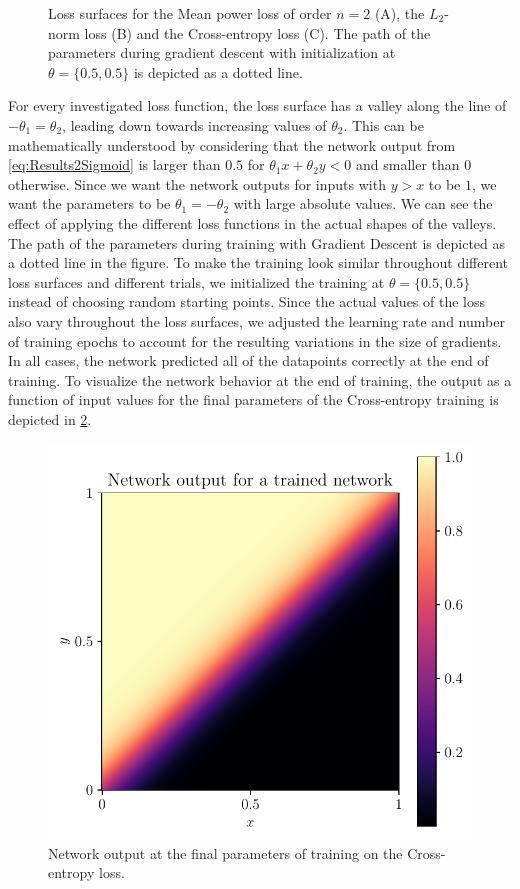 \begin{figure}
	\caption{Loss surfaces for the Mean power loss of order $n=2$ (A), the $L_2$-norm loss (B) and the Cross-entropy loss (C). The path of the parameters during gradient descent with initialization at $\theta = \{0.5, 0.5\}$ is depicted as a dotted line.}
	\label{fig:Results2LossSurfaces}
\end{figure}
For every investigated loss function, the loss surface has a valley along the line of $-\theta_1 = \theta_2$, leading down towards increasing values of  $\theta_2$. This can be mathematically understood by considering that the network output from \cref{eq:Results2Sigmoid} is larger than $0.5$ for $\theta_1x + \theta_2y < 0$ and smaller than $0$ otherwise. Since we want the network outputs for inputs with $y>x$ to be $1$, we want the parameters to be $\theta_1 = - \theta_2$ with large absolute values. We can see the effect of applying the different loss functions in the actual shapes of the valleys.\\
The path of the parameters during training with Gradient Descent is depicted as a dotted line in the figure. To make the training look similar throughout different loss surfaces and different trials, we initialized the training at $\theta = \{0.5, 0.5\}$ instead of choosing random starting points. Since the actual values of the loss also vary throughout the loss surfaces, we adjusted the learning rate and number of training epochs to account for the resulting variations in the size of gradients. In all cases, the network predicted all of the datapoints correctly at the end of training. To visualize the network behavior at the end of training, the output as a function of input values for the final parameters of the Cross-entropy training is depicted in \cref{fig:Results2NetworkOutput}.\\
\begin{figure}
	\centering
	\includegraphics{Experiment2/plots/Network_output.pdf}
	\caption{Network output at the final parameters of training on the Cross-entropy loss.}
	\label{fig:Results2NetworkOutput}	
\end{figure}
